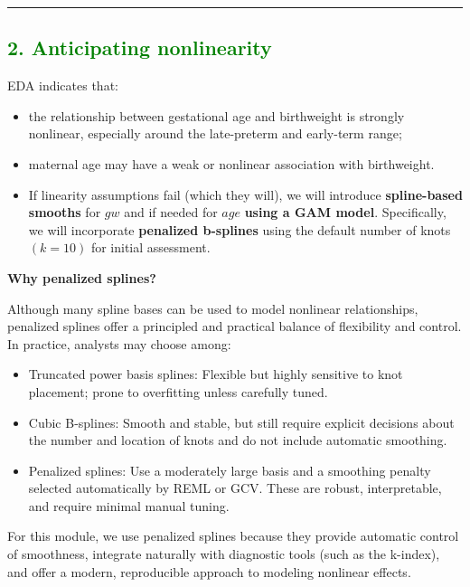 \documentclass[
  letterpaper,
  DIV=11,
  numbers=noendperiod]{scrreprt}
\providecommand{\tightlist}{%
  \setlength{\itemsep}{0pt}\setlength{\parskip}{0pt}}\usepackage{longtable,booktabs,array}
\begin{document}
\begin{center}\rule{0.5\linewidth}{0.5pt}\end{center}

\hypertarget{section-60}{%
\subsection*{\texorpdfstring{\textcolor{green}{2. Anticipating nonlinearity}}{}}\label{section-60}}

EDA indicates that:

\begin{itemize}
\item
  the relationship between gestational age and birthweight is strongly
  nonlinear, especially around the late-preterm and early-term range;
\item
  maternal age may have a weak or nonlinear association with
  birthweight.
\item
  If linearity assumptions fail (which they will), we will introduce
  \textbf{spline-based smooths} for \(gw\) and if needed for \(age\)
  \textbf{using a GAM model}. Specifically, we will incorporate
  \textbf{penalized b-splines} using the default number of knots
  \((k=10)\) for initial assessment.
\end{itemize}

\textbf{Why penalized splines?}

Although many spline bases can be used to model nonlinear relationships,
penalized splines offer a principled and practical balance of
flexibility and control. In practice, analysts may choose among:

\begin{itemize}
\tightlist
\item
  Truncated power basis splines: Flexible but highly sensitive to knot
  placement; prone to overfitting unless carefully tuned.
\item
  Cubic B-splines: Smooth and stable, but still require explicit
  decisions about the number and location of knots and do not include
  automatic smoothing.
\item
  Penalized splines: Use a moderately large basis and a smoothing
  penalty selected automatically by REML or GCV. These are robust,
  interpretable, and require minimal manual tuning.
\end{itemize}

For this module, we use penalized splines because they provide automatic
control of smoothness, integrate naturally with diagnostic tools (such
as the k-index), and offer a modern, reproducible approach to modeling
nonlinear effects.
\end{document}
